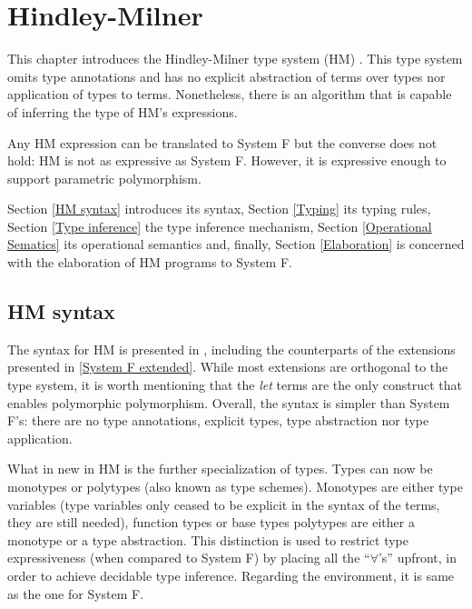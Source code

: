 \chapter{Hindley-Milner}
\label{cha:3}
This chapter introduces the Hindley-Milner type system (HM) \cite{damas}. This type system omits type annotations and has no explicit abstraction of terms over types nor application of types to terms. Nonetheless, there is an algorithm that is capable of inferring the type of HM's expressions.

Any HM expression can be translated to System F but the converse does not hold: HM is not as expressive as System F. However, it is expressive enough to support parametric polymorphism.

Section \ref{HM syntax} introduces its syntax, Section \ref{Typing} its typing rules, Section \ref{Type inference} the type inference mechanism, Section \ref{Operational Sematics} its operational semantics and, finally, Section \ref{Elaboration} is concerned with the elaboration of HM programs to System F.
\section{HM syntax}
The syntax for HM is presented in , including the counterparts of the extensions presented in \ref{System F extended}. While most extensions are orthogonal to the type system, it is worth mentioning that the \textit{let} terms are the only construct that enables polymorphic polymorphism. Overall, the syntax is simpler than System F's: there are no type annotations, explicit types, type abstraction nor type application.

What in new in HM is the further specialization of types. Types can now be monotypes or polytypes (also known as type schemes). Monotypes are either type variables (type variables only ceased to be explicit in the syntax of the terms, they are still needed), function types or base types  polytypes are either a monotype or a type abstraction. This distinction is used to restrict type expressiveness (when compared to System F) by placing all the ``$\forall$'s'' upfront, in order to achieve decidable type inference. Regarding the environment, it is same as the one for System F.





